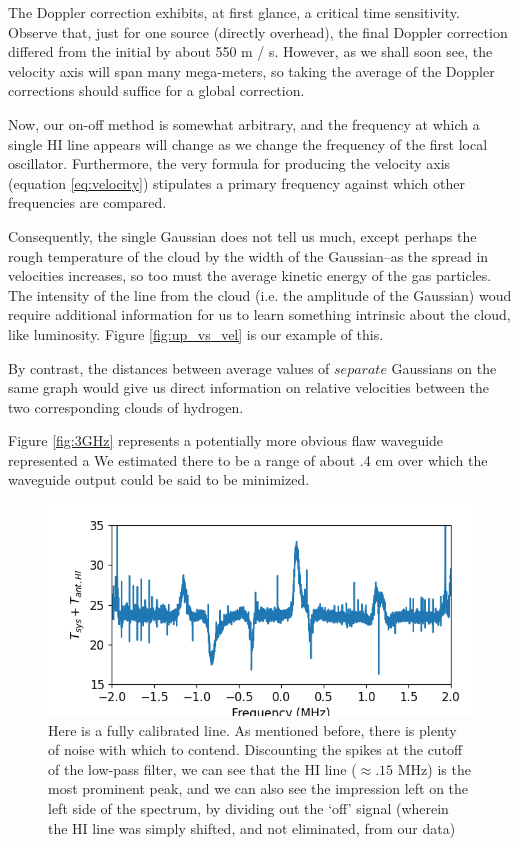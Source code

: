 \documentclass[12pt]{article}
\begin{document}
The Doppler correction exhibits, at first glance, a critical time sensitivity. Observe that, just for one source (directly overhead), the final Doppler correction differed from the initial by about 550 m / s. However, as we shall soon see, the velocity axis will span many mega-meters, so taking the average of the Doppler corrections should suffice for a global correction.

Now, our on-off method is somewhat arbitrary, and the frequency at which a single HI line appears will change as we change the frequency of the first local oscillator. Furthermore, the very formula for producing the velocity axis (equation \ref{eq:velocity}) stipulates a primary frequency against which other frequencies are compared.

Consequently, the single Gaussian does not tell us much, except perhaps the rough temperature of the cloud by the width of the Gaussian--as the spread in velocities increases, so too must the average kinetic energy of the gas particles. The intensity of the line from the cloud (i.e. the amplitude of the Gaussian) woud require additional information for us to learn something intrinsic about the cloud, like luminosity. Figure \ref{fig:up_vs_vel} is our example of this.

By contrast, the distances between average values of $separate$ Gaussians on the same graph would give us direct information on relative velocities between the two corresponding clouds of hydrogen. 

Figure \ref{fig:3GHz} represents a potentially more obvious flaw  waveguide represented a We estimated there to be a range of about .4 cm over which the waveguide output could be said to be minimized. 

\begin{figure}
	\centering
	\includegraphics[width=.6\linewidth]{up_vs_frq}
	\caption{Here is a fully calibrated line. As mentioned before, there is plenty of noise with which to contend. Discounting the spikes at the cutoff of the low-pass filter, we can see that the HI line ($\approx .15$ MHz) is the most prominent peak, and we can also see the impression left on the left side of the spectrum, by dividing out the `off' signal (wherein the HI line was simply shifted, and not eliminated, from our data)}
	\label{fig:up_vs_frq}
\end{figure}
\end{document}
